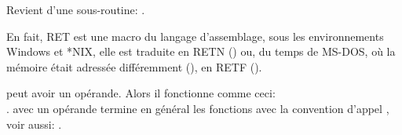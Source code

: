 \item[RET] Revient d'une sous-routine: .

En fait, RET
est une macro du langage d'assemblage, sous les environnements Windows et *NIX, elle
est traduite en
RETN ()
ou, du temps de MS-DOS, où la mémoire était adressée différemment
(), en RETF ().

 peut avoir un opérande.
Alors il fonctionne comme ceci: \\
.
 avec un opérande termine en général les fonctions avec la convention d'appel
, voir aussi: .

